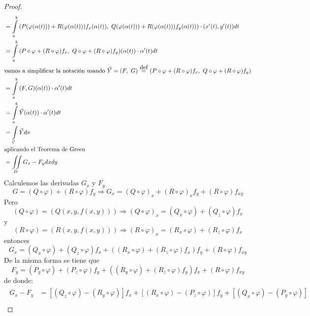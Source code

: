 \documentclass{report}
\newcommand\defeq{\stackrel{\mathclap{\normalfont\mbox{def}}}{~=~}}
\begin{document}
\begin{proof}
\begin{gather*}
\begin{aligned}
			 & = \int\limits_a^b{\left( P(\varphi (\alpha (t))) + R(\varphi (\alpha (t)))f_x(\alpha(t)),~Q(\varphi (\alpha (t))) + R(\varphi (\alpha (t)))f_y(\alpha(t))\right)\cdot (x'(t),y'(t))dt}       \\
			 & = \int\limits_a^b{(P\circ \varphi + (R \circ \varphi)f_x,~Q\circ \varphi + (R \circ \varphi)f_y)(\alpha (t))\cdot \alpha '(t) dt}                                                            \\
			 & \text{vamos a simplificar la notación usando } \vec{Y} = (F,~G)\defeq (P\circ \varphi + (R \circ \varphi)f_x,~Q\circ \varphi + (R \circ \varphi)f_y)                                         \\
			 & = \int\limits_a^b{(F,G)(\alpha (t))\cdot \alpha '(t)dt}                                                                                                                                             \\
			 & = \int\limits_a^b{\vec{Y}(\alpha (t))\cdot \alpha '(t)dt}                                                                                                                                           \\
			 & = \int\limits_{\mathcal{C}}{\vec{Y}ds}                                                                                                                                           \\
			 & \text{aplicando el Teorema de Green} \\
			 & = \iint\limits_D{G_x-F_ydxdy}
		\end{aligned}
	\end{gather*}
	Calculemos las derivadas $G_x$ y $F_y$
	\[
		G = (Q \circ \varphi) + (R \circ \varphi)f_y
		\Rightarrow G_x = (Q \circ \varphi)_x + (R \circ \varphi)_xf_y+ (R \circ \varphi)f_{xy}
	\]
	Pero 
	\[
		(Q\circ \varphi) = (Q(x,y,f(x,y))) 
		\Rightarrow 
		(Q\circ \varphi)_x = 
		(Q_x\circ\varphi) + (Q_z\circ\varphi)f_x
	\]
	y 
	\[
		(R\circ\varphi) = (R(x,y,f(x,y))) 
		\Rightarrow 
		(R\circ\varphi)_x = 
		(R_x\circ\varphi) + (R_z\circ\varphi)f_x
	\]
	entonces
	\[
		G_x = (Q_x\circ\varphi) + (Q_z\circ\varphi)f_x + 
		((R_x\circ\varphi) + (R_z\circ\varphi)f_x)f_y+ 
		(R \circ \varphi)f_{xy}
	\]
	De la misma forma se tiene que
	\[
		F_y = (P_y \circ \varphi) + (P_z \circ \varphi)f_y +
		((R_y\circ\varphi)+(R_z\circ\varphi)f_y)f_x+
		(R\circ\varphi)f_{xy}
	\]
	de donde:
	\begin{gather*}
		\begin{aligned}
			G_x - F_y & = [(Q_z\circ\varphi)-(R_y\circ\varphi)]f_x + [(R_x\circ\varphi)-(P_z\circ\varphi)]f_y+[(Q_x\circ\varphi)-(P_y\circ\varphi)] \\ 

\end{aligned}
\end{gather*}
\end{proof}
\end{document}
